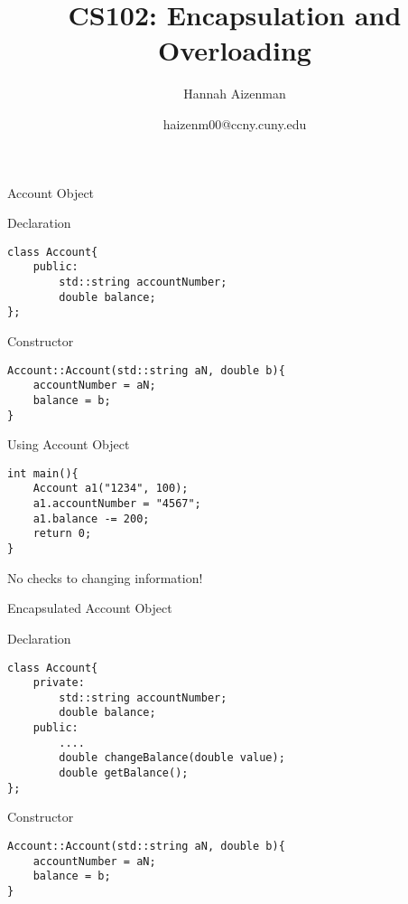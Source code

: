 \documentclass[xcolor={dvipsnames}]{beamer}
\begin{document}
\title{ CS102: Encapsulation and Overloading}
\author{Hannah Aizenman}
\date{haizenm00@ccny.cuny.edu}


\begin{frame}
	\titlepage
\end{frame}


\begin{frame}[fragile]{Account Object}
\begin{block}{Declaration}
\begin{verbatim}
class Account{
    public:
        std::string accountNumber;
        double balance;
};
\end{verbatim}
\end{block}
\pause
\begin{block}{Constructor}
\begin{verbatim}
Account::Account(std::string aN, double b){
    accountNumber = aN;
    balance = b;
}
\end{verbatim}
\end{block}
\end{frame}


\begin{frame}[fragile]{Using Account Object}
\begin{verbatim}
int main(){
    Account a1("1234", 100);
    a1.accountNumber = "4567";
    a1.balance -= 200;
    return 0;
}
\end{verbatim}
\pause
\begin{center}
\huge
No checks to changing information!
\end{center}
\end{frame}

\begin{frame}[fragile]{Encapsulated Account Object}
\begin{block}{Declaration}
\begin{verbatim}
class Account{
    private:
        std::string accountNumber;
        double balance;
    public: 
        ....
        double changeBalance(double value);
        double getBalance();
};
\end{verbatim}
\end{block}
\pause
\begin{block}{Constructor}
\begin{verbatim}
Account::Account(std::string aN, double b){
    accountNumber = aN;
    balance = b;
}
\end{verbatim}
\end{block}
\end{frame}
\end{document}
